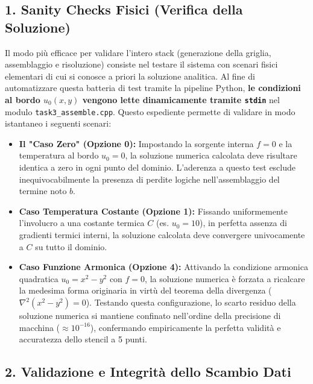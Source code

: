 \documentclass[a4paper,12pt]{article}
\begin{document}
\subsection*{1. Sanity Checks Fisici (Verifica della Soluzione)}

Il modo più efficace per validare l'intero stack (generazione della griglia, assemblaggio e risoluzione) consiste nel testare il sistema con scenari fisici elementari di cui si conosce a priori la soluzione analitica. Al fine di automatizzare questa batteria di test tramite la pipeline Python, \textbf{le condizioni al bordo $u_0(x,y)$ vengono lette dinamicamente tramite \texttt{stdin}} nel modulo \texttt{task3\_assemble.cpp}. Questo espediente permette di validare in modo istantaneo i seguenti scenari:

\begin{itemize}
  \item \textbf{Il "Caso Zero" (Opzione 0):} Impostando la sorgente interna $f = 0$ e la temperatura al bordo $u_0 = 0$, la soluzione numerica calcolata deve risultare identica a zero in ogni punto del dominio. L'aderenza a questo test esclude inequivocabilmente la presenza di perdite logiche nell'assemblaggio del termine noto $b$.
  \item \textbf{Caso Temperatura Costante (Opzione 1):} Fissando uniformemente l'involucro a una costante termica $C$ (es. $u_0 = 10$), in perfetta assenza di gradienti termici interni, la soluzione calcolata deve convergere univocamente a $C$ su tutto il dominio.
  \item \textbf{Caso Funzione Armonica (Opzione 4):} Attivando la condizione armonica quadratica $u_0 = x^2 - y^2$ con $f=0$, la soluzione numerica è forzata a ricalcare la medesima forma originaria in virtù del teorema della divergenza (\(\nabla^2(x^2 - y^2) = 0\)). Testando questa configurazione, lo scarto residuo della soluzione numerica si mantiene confinato nell'ordine della precisione di macchina ($\approx 10^{-16}$), confermando empiricamente la perfetta validità e accuratezza dello stencil a 5 punti.
\end{itemize}

\subsection*{2. Validazione e Integrità dello Scambio Dati}
\end{document}

